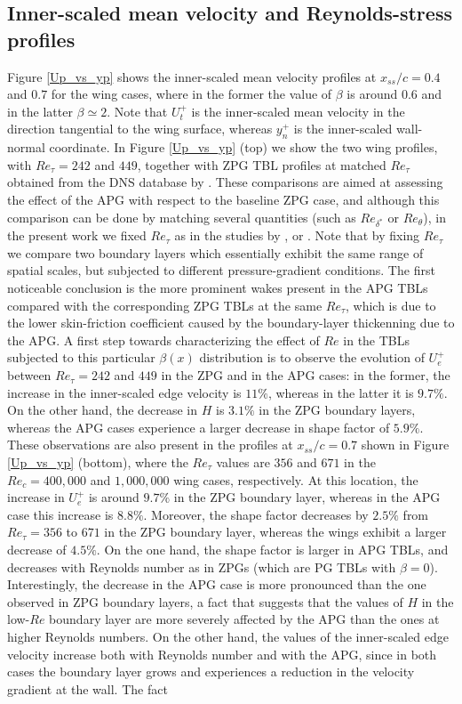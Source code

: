 \subsection{Inner-scaled mean velocity and Reynolds-stress profiles}

Figure \ref{Up_vs_yp} shows the inner-scaled mean velocity profiles at $x_{ss} /c =0.4$ and $0.7$ for the wing cases, where in the former the value of $\beta$ is around $0.6$ and in the latter $\beta \simeq 2$. Note that $U^{+}_{t}$ is the inner-scaled mean velocity in the direction tangential to the wing surface, whereas $y^{+}_{n}$ is the inner-scaled wall-normal coordinate. In Figure \ref{Up_vs_yp} (top) we show the two wing profiles, with $Re_{\tau}=242$ and $449$, together with ZPG TBL profiles at matched $Re_{\tau}$ obtained from the DNS database by \cite{schlatter_orlu10}. These comparisons are aimed at assessing the effect of the APG with respect to the baseline ZPG case, and although this comparison can be done by matching several quantities (such as $Re_{\delta^{*}}$ or $Re_{\theta}$), in the present work we fixed $Re_{\tau}$ as in the studies by \cite{monty_et_al}, \cite{harun_et_al} or \cite{bobke_et_al}. Note that by fixing $Re_{\tau}$ we compare two boundary layers which essentially exhibit the same range of spatial scales, but subjected to different pressure-gradient conditions. The first noticeable conclusion is the more prominent wakes present in the APG TBLs compared with the corresponding ZPG TBLs at the same $Re_{\tau}$, which is due to the lower skin-friction coefficient caused by the boundary-layer thickenning due to the APG. A first step towards characterizing the effect of $Re$ in the TBLs subjected to this particular $\beta(x)$ distribution is to observe the evolution of $U^{+}_{e}$ between $Re_{\tau}=242$ and $449$ in the ZPG and in the APG cases: in the former, the increase in the inner-scaled edge velocity is $11\%$, whereas in the latter it is $9.7\%$. On the other hand, the decrease in $H$ is $3.1\%$ in the ZPG boundary layers, whereas the APG cases experience a larger decrease in shape factor of $5.9\%$. These observations are also present in the profiles at $x_{ss}/c=0.7$ shown in Figure \ref{Up_vs_yp} (bottom), where the $Re_{\tau}$ values are $356$ and $671$ in the $Re_{c}=400,000$ and $1,000,000$ wing cases, respectively. At this location, the increase in $U^{+}_{e}$ is around $9.7\%$ in the ZPG boundary layer, whereas in the APG case this increase is $8.8\%$. Moreover, the shape factor decreases by $2.5\%$ from $Re_{\tau}=356$ to $671$ in the ZPG boundary layer, whereas the wings exhibit a larger decrease of $4.5\%$. On the one hand, the shape factor is larger in APG TBLs, and decreases with Reynolds number as in ZPGs (which are PG TBLs with $\beta=0$). Interestingly, the decrease in the APG case is more pronounced than the one observed in ZPG boundary layers, a fact that suggests that the values of $H$ in the low-$Re$ boundary layer are more severely affected by the APG than the ones at higher Reynolds numbers. On the other hand, the values of the inner-scaled edge velocity increase both with Reynolds number and with the APG, since in both cases the boundary layer grows and experiences a reduction in the velocity gradient at the wall. The fact 